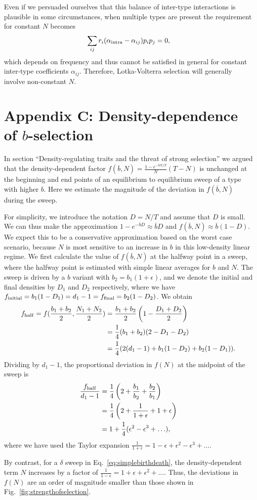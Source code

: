 \documentclass[12pt]{article}
\begin{document}
Even if we persuaded ourselves that this balance of inter-type interactions is plausible in some circumstances, when multiple types are present the requirement for constant $N$ becomes
\begin{equation}
\sum_{ij}r_i(\alpha_{\rm intra}-\alpha_{ij})p_ip_j=0,
\end{equation}
which depends on frequency and thus cannot be satisfied in general for constant inter-type coefficients $\alpha_{ij}$. Therefore, Lotka-Volterra selection will generally involve non-constant $N$.

\section*{Appendix C: Density-dependence of $b$-selection}

In section ``Density-regulating traits and the threat of strong selection'' we argued that the density-dependent factor $f(\overline{b},N)=\frac{1-e^{-\overline{b}N/T}}{N}(T-N)$ is unchanged at the beginning and end points of an equilibrium to equilibrium sweep of a type with higher $b$. Here we estimate the magnitude of the deviation in $f(\overline{b},N)$ during the sweep. 

For simplicity, we introduce the notation $D=N/T$ and assume that $D$ is small. We can thus make the approximation $1-e^{-\overline{b}D}\approx \overline{b}D$ and $f(\overline{b},N)\approx \overline{b}(1-D)$. We expect this to be a conservative approximation based on the worst case scenario, because $N$ is most sensitive to an increase in $b$ in this low-density linear regime. We first calculate the value of $f(\overline{b},N)$ at the halfway point in a sweep, where the halfway point is estimated with simple linear averages for $b$ and $N$. The sweep is driven by a $b$ variant with $b_2=b_1(1+\epsilon)$, and we denote the initial and final densities by $D_1$ and $D_2$ respectively, where we have $f_{\rm initial}=b_1(1-D_1)=d_1-1=f_{\rm final}=b_2(1-D_2)$. We obtain
\begin{align}
f_{\rm{half}}=f(\frac{b_1+b_2}{2},\frac{N_1+N_2}{2})&=\frac{b_1+b_2}{2}\left(1-\frac{D_1+D_2}{2}\right) \nonumber \\
&=\frac{1}{4} (b_1+b_2)(2-D_1-D_2) \nonumber \\
&=\frac{1}{4} (2(d_1-1)+b_1(1-D_2)+b_2(1-D_1)).
\end{align}
Dividing by $d_1-1$, the proportional deviation in $f(N)$ at the midpoint of the sweep is
\begin{align}
\frac{f_{\rm{half}}}{d_1-1}&=\frac{1}{4}\left(2+\frac{b_1}{b_2}+\frac{b_2}{b_1}\right)\nonumber \\
&=\frac{1}{4}\left(2+\frac{1}{1+\epsilon}+1+\epsilon\right)\nonumber \\
&=1+\frac{1}{4}(\epsilon^2-\epsilon^3+\ldots),
\end{align}
where we have used the Taylor expansion $\frac{1}{1+\epsilon}=1-\epsilon+\epsilon^2-\epsilon^3+\ldots$. 

By contrast, for a $\delta$ sweep in Eq.~\eqref{eq:simplebirthdeath}, the density-dependent term $N$ increases by a factor of $\frac{1}{1-\epsilon}=1+\epsilon+\epsilon^2+\ldots$. Thus,  the deviations in $f(N)$ are an order of magnitude smaller than those shown in Fig.~\eqref{fig:strengthofselection}.
\end{document}
